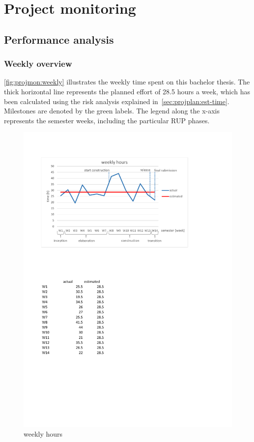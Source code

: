 \chapter{Project monitoring}
\section{Performance analysis}
\subsection{Weekly overview}

\autoref{fig:projmon:weekly} illustrates the weekly time spent on this bachelor
thesis. The thick horizontal line represents the planned effort of 28.5 hours a
week, which has been calculated using the risk analysis explained
in~\autoref{sec:projplan:est-time}.  Milestones are denoted by the green
labels. The legend along the x-axis represents the semester weeks, including
the particular RUP phases.


\begin{figure}[]
	\includegraphics[trim=2cm 18.3cm 4.6cm 2.8cm, clip=true, width=\textwidth]{img/project_monitoring_weekly_diagram.pdf}
	\caption{weekly hours}
	\label{fig:weekly:hours}
\end{figure}

